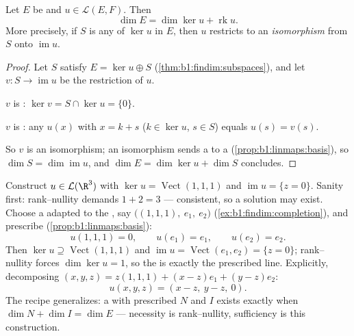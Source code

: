 \begin{theorem}\label{thm:b1:linmaps:ranknullity}
Let $E$ be  and $u \in \mathcal{L}(E, F)$.
Then
\[
\dim E = \dim \ker u + \operatorname{rk} u .
\]
More precisely, if $S$ is any   of $\ker u$ in
$E$, then $u$ restricts to an \emph{isomorphism} from $S$ onto
$\operatorname{im} u$.
\end{theorem}

\begin{proof}
Let $S$ satisfy $E = \ker u \oplus S$
(\cref{thm:b1:findim:subspaces}), and let $v \colon S \to
\operatorname{im} u$ be the restriction of $u$.

$v$ is : $\ker v = S \cap \ker u = \{0\}$.

$v$ is : any $u(x)$ with $x = k + s$ ($k \in \ker u$, $s
\in S$) equals $u(s) = v(s)$.

So $v$ is an isomorphism; an isomorphism sends a  to a 
(\cref{prop:b1:linmaps:basis}), so $\dim S = \dim\operatorname{im}
u$, and $\dim E = \dim\ker u + \dim S$ concludes.
\end{proof}

\begin{example}
\label{ex:b1:linmaps:tospec}
Construct $u \in \mathcal{L}(\R^3)$ with $\ker u =
\operatorname{Vect}(1,1,1)$ and $\operatorname{im} u = \{z =
0\}$. Sanity first: rank--nullity demands $1 + 2 = 3$ ---
consistent, so a solution may exist. Choose a  adapted to
the , say $\bigl((1,1,1),\ e_1,\ e_2\bigr)$
(\cref{ex:b1:findim:completion}), and prescribe 
(\cref{prop:b1:linmaps:basis}):
\[
u(1,1,1) = 0, \qquad u(e_1) = e_1, \qquad u(e_2) = e_2 .
\]
Then $\ker u \supseteq \operatorname{Vect}(1,1,1)$ and
$\operatorname{im} u = \operatorname{Vect}(e_1, e_2) = \{z =
0\}$; rank--nullity forces $\dim\ker u = 1$, so the  is
exactly the prescribed line. Explicitly, decomposing $(x, y, z)
= z(1,1,1) + (x - z)e_1 + (y - z)e_2$:
\[
u(x, y, z) = (x - z,\ y - z,\ 0).
\]
The recipe generalizes: a  with prescribed  $N$
and  $I$ exists exactly when $\dim N + \dim I = \dim E$
--- necessity is rank--nullity, sufficiency is this
construction.
\end{example}

